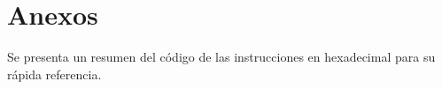 
\newpage


\appendix
\section{Anexos}\label{apen1}
Se presenta un resumen del c\' odigo de las instrucciones en hexadecimal para su r\' apida referencia.




%



